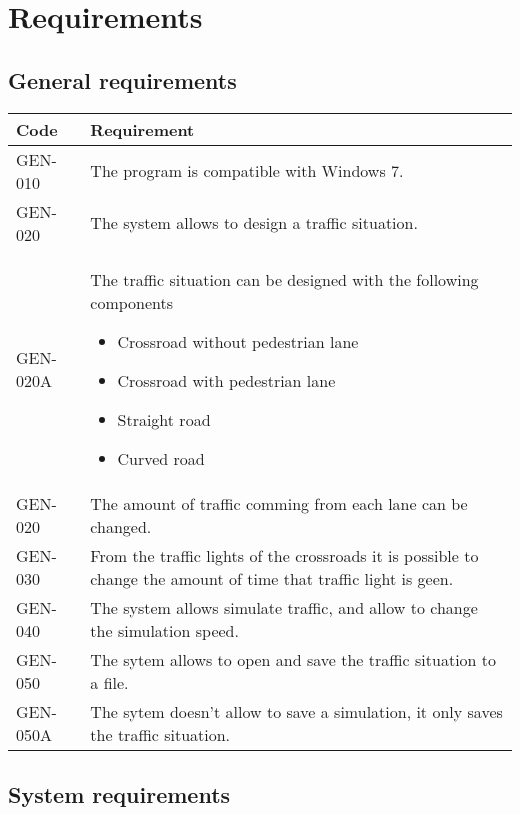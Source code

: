 \section{Requirements}
\subsection{General requirements}
\begin{tabularx}{\textwidth}{|p{2cm}X|}\hline
	Code & Requirement \\\hline
	GEN-010 & The program is compatible with Windows 7.\\\hline
	GEN-020 & The system allows to design a traffic situation.\\\hline
	GEN-020A & The traffic situation can be designed with the following components
	\begin{itemize}[noitemsep,nolistsep]
		\item Crossroad without pedestrian lane
		\item Crossroad with pedestrian lane
		\item Straight road
		\item Curved road
	\end{itemize}\\\hline
	GEN-020 & The amount of traffic comming from each lane can be changed.\\\hline
	GEN-030 & From the traffic lights of the crossroads it is possible to change the amount of time that traffic light is geen.\\\hline
	GEN-040 & The system allows simulate traffic, and allow to change the simulation speed.\\\hline
	GEN-050 & The sytem allows to open and save the traffic situation to a file.\\\hline
	GEN-050A & The sytem doesn't allow to save a simulation, it only saves the traffic situation.\\\hline
\end{tabularx}

\subsection{System requirements}

